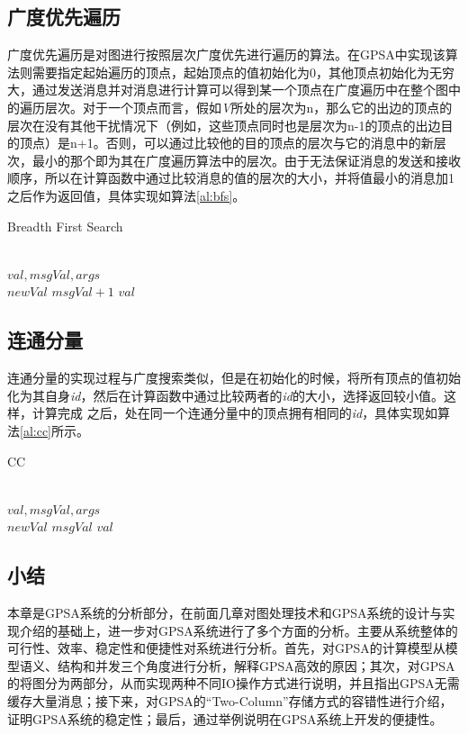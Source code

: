 \subsection{广度优先遍历}
广度优先遍历是对图进行按照层次广度优先进行遍历的算法。在GPSA中实现该算法则需要指定起始遍历的顶点，起始顶点的值初始化为0，其他顶点初始化为无穷大，通过发送消息并对消息进行计算可以得到某一个顶点在广度遍历中在整个图中的遍历层次。对于一个顶点而言，假如\textit{V}所处的层次为n，那么它的出边的顶点的层次在没有其他干扰情况下（例如，这些顶点同时也是层次为n-1的顶点的出边目的顶点）是n+1。否则，可以通过比较他的目的顶点的层次与它的消息中的新层次，最小的那个即为其在广度遍历算法中的层次。由于无法保证消息的发送和接收顺序，所以在计算函数中通过比较消息的值的层次的大小，并将值最小的消息加1之后作为返回值，具体实现如算法\ref{al:bfs}。
\begin{algorithm}
{
{
\renewcommand\baselinestretch{1.5}\selectfont %

\caption{Breadth First Search}
\label{al:bfs}
\begin{algorithmic}[1]
\REQUIRE ~\\
	$val,msgVal,args$
\ENSURE ~\\
	$newVal$
	 \RETURN $ msgVal + 1$
\ENDIF
\RETURN $val$

\end{algorithmic}
}
\par}
\end{algorithm}
\subsection{连通分量}
连通分量的实现过程与广度搜索类似，但是在初始化的时候，将所有顶点的值初始化为其自身\textit{id}，然后在计算函数中通过比较两者的\textit{id}的大小，选择返回较小值。这样，计算完成
之后，处在同一个连通分量中的顶点拥有相同的\textit{id}，具体实现如算法\ref{al:cc}所示。
\begin{algorithm}
{
{
\renewcommand\baselinestretch{1.5}\selectfont %

\caption{CC}
\label{al:cc}
\begin{algorithmic}[1]
\REQUIRE ~\\
	$val,msgVal,args$
\ENSURE ~\\
	$newVal$
	 \RETURN $ msgVal$
\ENDIF
\RETURN $val$

\end{algorithmic}
}
\par}
\end{algorithm}

\subsection{小结}


本章是GPSA系统的分析部分，在前面几章对图处理技术和GPSA系统的设计与实现介绍的基础上，进一步对GPSA系统进行了多个方面的分析。主要从系统整体的可行性、效率、稳定性和便捷性对系统进行分析。首先，对GPSA的计算模型从模型语义、结构和并发三个角度进行分析，解释GPSA高效的原因；其次，对GPSA的将图分为两部分，从而实现两种不同IO操作方式进行说明，并且指出GPSA无需缓存大量消息；接下来，对GPSA的“Two-Column”存储方式的容错性进行介绍，证明GPSA系统的稳定性；最后，通过举例说明在GPSA系统上开发的便捷性。



